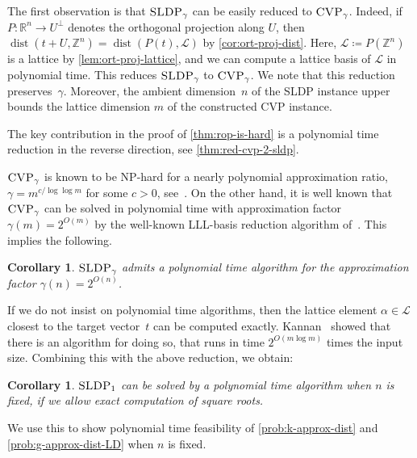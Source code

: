 \documentclass[10pt,a4paper]{article}
\newtheorem{corollary}[theorem]{Corollary}
\theoremstyle{definition}
\DeclareMathOperator{\dist}{dist}
\newcommand{\ZZ}{\mathbb{Z}}
\newcommand{\RR}{\mathbb{R}}
\numberwithin{equation}{section}
\begin{document}
The first observation is that $\textsc{SLDP}_\gamma$ can be easily reduced to $\textsc{CVP}_\gamma$.
Indeed, if $P:\RR^n\rightarrow U^\perp$ denotes the orthogonal projection along $U$, then
$\dist(t+U,\ZZ^n)=\dist(P(t),\mathcal{L})$ by \cref{cor:ort-proj-dist}.
Here, $\mathcal{L}\coloneqq P(\ZZ^n)$ is a lattice by \cref{lem:ort-proj-lattice},
and we can compute a lattice basis of $\mathcal{L}$ in polynomial time. %
This reduces $\textsc{SLDP}_\gamma$ to  $\textsc{CVP}_\gamma$.
We note that this reduction preserves~$\gamma$.
Moreover, the ambient dimension~$n$ of the \textsc{SLDP} instance
upper bounds the lattice dimension $m$ of the constructed \textsc{CVP} instance.

The key contribution in the proof of \cref{thm:rop-is-hard}
is a polynomial time reduction in the reverse direction,
see \cref{thm:red-cvp-2-sldp}.

$\textsc{CVP}_\gamma$ is known to be \textsc{NP}-hard for a nearly polynomial approximation ratio,
$\gamma=m^{c/\log\log m}$ for some $c>0$, see~\cite{dinurcvp}.
On the other hand, it is well known that
$\textsc{CVP}_{\gamma}$ can be solved in polynomial time
with approximation factor $\gamma(m) = 2^{O(m)}$
by the well-known LLL-basis reduction algorithm of~\cite{lll}.
This implies the following.

\begin{corollary}\label{cor:sldp-exact}
\label{cor:sldp-in-p-for-two-to-n}
 $\textsc{SLDP}_\gamma$ admits a polynomial time algorithm for the
 approximation factor $\gamma(n) = 2^{O(n)}$.
\end{corollary}

If we do not insist on polynomial time algorithms,
then the lattice element $\alpha\in\mathcal{L}$ closest to the target vector~$t$
can be computed exactly.
Kannan~\cite{kannan1987} showed that there is an algorithm for doing so,
that runs in time $2^{O(m\log m)}$ times the input size.
Combining this with the above reduction, we obtain:

\begin{corollary}\label{cor:sldp-fixed-dimension}
$\textsc{SLDP}_1$ can be solved by a polynomial time algorithm
when $n$ is fixed, if we allow exact computation of square roots.
\end{corollary}

We use this to show polynomial time feasibility of
\cref{prob:k-approx-dist} and \cref{prob:g-approx-dist-LD}
when $n$ is fixed.
\end{document}

